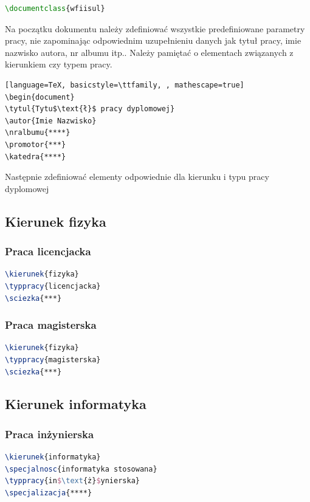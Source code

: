 \documentclass{wfiisul}
\begin{document}
\begin{lstlisting}[language=TeX, basicstyle=\ttfamily]
\documentclass{wfiisul}
\end{lstlisting}

Na początku dokumentu należy zdefiniować wszystkie predefiniowane parametry pracy, nie zapominając odpowiednim  uzupełnieniu danych jak tytuł pracy, imie nazwisko autora, nr albumu itp.. Należy pamiętać o elementach związanych z kierunkiem czy typem pracy.

\begin{lstlisting}[language=TeX, basicstyle=\ttfamily, , mathescape=true]
\begin{document}
\tytul{Tytu$\text{ł}$ pracy dyplomowej}
\autor{Imie Nazwisko}
\nralbumu{****}
\promotor{***}
\katedra{****}
\end{lstlisting}

Następnie zdefiniować elementy odpowiednie dla kierunku i typu pracy dyplomowej

\subsection{Kierunek fizyka}

\subsubsection{Praca licencjacka}
\begin{lstlisting}[language=TeX, basicstyle=\ttfamily]
\kierunek{fizyka}
\typpracy{licencjacka}
\sciezka{***}
\end{lstlisting}

\subsubsection{Praca magisterska}
\begin{lstlisting}[language=TeX, basicstyle=\ttfamily]
\kierunek{fizyka}
\typpracy{magisterska}
\sciezka{***}
\end{lstlisting}

\subsection{Kierunek informatyka}
\subsubsection{Praca inżynierska}
\begin{lstlisting}[language=TeX, basicstyle=\ttfamily, mathescape=true]
\kierunek{informatyka}
\specjalnosc{informatyka stosowana}
\typpracy{in$\text{ż}$ynierska}
\specjalizacja{****}
\end{lstlisting}
\end{document}

